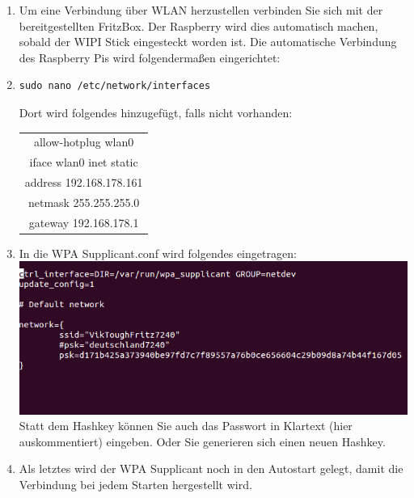 \documentclass{article}
\begin{document}
\begin{enumerate}


\item[]Um eine Verbindung über WLAN herzustellen verbinden Sie sich mit der bereitgestellten FritzBox. Der Raspberry wird dies automatisch machen, sobald der WIPI Stick eingesteckt worden ist. Die automatische Verbindung des Raspberry Pis wird folgendermaßen eingerichtet:\\

\item
\begin{verbatim}
sudo nano /etc/network/interfaces
\end{verbatim}
Dort wird folgendes hinzugefügt, falls nicht vorhanden:\\

\begin{center}

\begin{tabular}{|c|}
\hline
allow-hotplug wlan0\\
iface wlan0 inet static\\
address 192.168.178.161\\
netmask 255.255.255.0\\
gateway 192.168.178.1\\
\hline
\end{tabular}
\end{center}

\item In die WPA Supplicant.conf wird folgendes eingetragen:\\

\includegraphics[width=1.2\textwidth]{graphics/wpa.png}\\
Statt dem Hashkey können Sie auch das Passwort in Klartext (hier auskommentiert) eingeben. Oder Sie generieren sich einen neuen Hashkey.\\

\item Als letztes wird der WPA Supplicant noch in den Autostart gelegt, damit die Verbindung bei jedem Starten hergestellt wird.


\end{enumerate}
\end{document}
